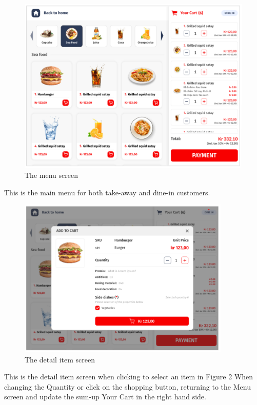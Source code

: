 \begin{figure}[H]
  \centering
  \includegraphics[width=\textwidth]{./assets/t1/UI_menu.png}
  \caption{The menu screen}
\end{figure}

This is the main menu for both take-away and dine-in customers.

\begin{figure}[H]
  \centering
  \includegraphics[width=0.9\textwidth]{./assets/t1/UI_detail.png}
  \caption{The detail item screen}
\end{figure}

This is the detail item screen when clicking to select an item in Figure 2
When changing the Quantity or click on the shopping button, returning to the Menu screen and update the sum-up Your Cart in the right hand side.

